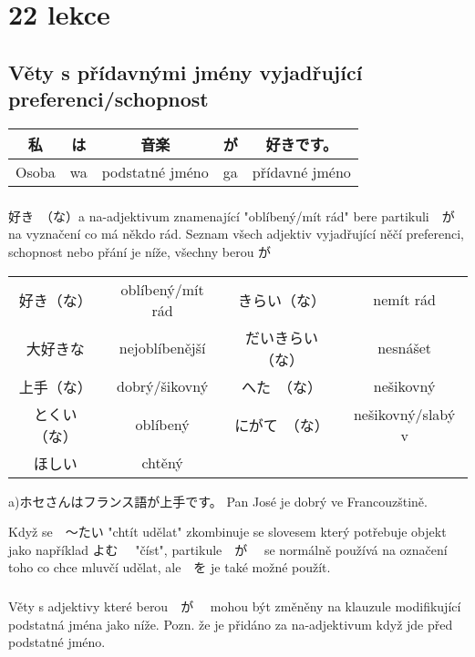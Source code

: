 \section{22 lekce}
\label{sec:lekce_22}

\subsection{Věty s přídavnými jmény vyjadřující preferenci/schopnost}
\begin{center}
\begin{tabular}{||c|c||c|c||c||}
\hline
私&は&音楽&が&好きです。\\
\hline
Osoba&wa&podstatné jméno&ga&přídavné jméno\\
\hline
\end{tabular}
\end{center}

\subsubsection{} 好き　（な）a na-adjektivum znamenající "oblíbený/mít rád" bere partikuli　が　 na vyznačení co má někdo rád. Seznam všech adjektiv vyjadřující něčí preferenci, schopnost nebo přání je níže, všechny berou が

\begin{center}
\begin{tabular}{cccc}
好き（な）&oblíbený/mít rád&きらい（な）&nemít rád\\
大好きな&nejoblíbenější&だいきらい（な）&nesnášet\\
上手（な）&dobrý/šikovný&へた　（な）&nešikovný\\
とくい（な）&oblíbený&にがて　（な）&nešikovný/slabý v\\
ほしい&chtěný&&\\
\end{tabular}
\end{center}

a)ホセさんはフランス語が上手です。 Pan José je dobrý ve Francouzštině.

Když se　〜たい  "chtít udělat" zkombinuje se slovesem který potřebuje objekt jako například よむ　 "číst", partikule　が　 se normálně používá na označení toho co chce mluvčí udělat, ale　を je také možné použít.


\subsubsection{} Věty s adjektivy které berou　が　 mohou být změněny na klauzule modifikující podstatná jména jako níže. Pozn. že je přidáno za na-adjektivum když jde před podstatné jméno. 

